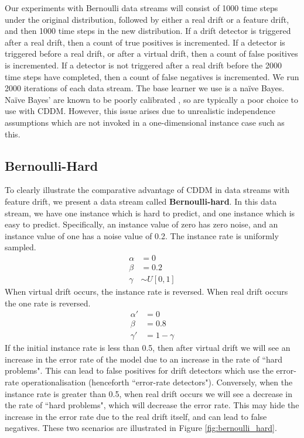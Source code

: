 Our experiments with Bernoulli data streams will consist of 1000 time steps under the original distribution, followed by either a real drift or a feature drift, and then 1000 time steps in the new distribution. If a drift detector is triggered after a real drift, then a count of true positives is incremented. If a detector is triggered before a real drift, or after a virtual drift, then a count of false positives is incremented. If a detector is not triggered after a real drift before the 2000 time steps have completed, then a count of false negatives is incremented. We run 2000 iterations of each data stream. The base learner we use is a na\"{i}ve Bayes. Na\"{i}ve Bayes' are known to be poorly calibrated \cite{calibrating}, so are typically a poor choice to use with CDDM. However, this issue arises due to unrealistic independence assumptions which are not invoked in a one-dimensional instance case such as this.

\subsection{Bernoulli-Hard}

To clearly illustrate the comparative advantage of CDDM in data streams with feature drift, we present a data stream called {\bf Bernoulli-hard}. In this data stream, we have one instance which is hard to predict, and one instance which is easy to predict. Specifically, an instance value of zero has zero noise, and an instance value of one has a noise value of 0.2. The instance rate is uniformly sampled.
\begin{align}
  \alpha &= 0 \\
  \beta &= 0.2 \\
  \gamma &\sim U[0,1]
\end{align}
When virtual drift occurs, the instance rate is reversed. When real drift occurs the one rate is reversed.
\begin{align}
  \alpha' &= 0 \\
  \beta &= 0.8 \\
  \gamma' &= 1 - \gamma
\end{align}
If the initial instance rate is less than 0.5, then after virtual drift we will see an increase in the error rate of the model due to an increase in the rate of ``hard problems". This can lead to false positives for drift detectors which use the error-rate operationalisation (henceforth ``error-rate detectors"). Conversely, when the instance rate is greater than 0.5, when real drift occurs we will see a decrease in the rate of ``hard problems", which will decrease the error rate. This may hide the increase in the error rate due to the real drift itself, and can lead to false negatives. These two scenarios are illustrated in Figure \ref{fig:bernoulli_hard}.

